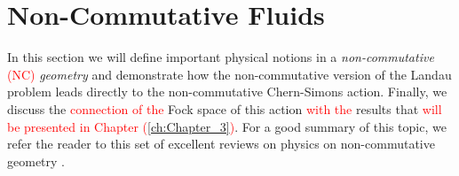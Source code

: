 %
        \section{Non-Commutative Fluids}
    In this section we will define important physical notions in a \textit{non-commutative} \textcolor{red}{(NC)} \textit{geometry}  \colorbox{red}{ } and demonstrate how the non-commutative version of the Landau problem leads directly to the non-commutative Chern-Simons action. Finally, we discuss the \textcolor{red}{connection of the} Fock space of this action \textcolor{red}{with the} results that \textcolor{red}{will be presented in Chapter (\ref{ch:Chapter_3})}. For a good summary of this topic, we refer the reader to this set of excellent reviews on physics on non-commutative geometry \cite{Polychronakos:2007df, Szabo:2001kg, Douglas:2001ba}.

